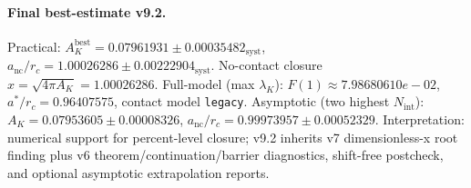 \paragraph{Final best-estimate v9.2.}
Practical: $A_K^{\mathrm{best}} = 0.07961931 \pm 0.00035482_{\mathrm{syst}}$, $a_{\mathrm{nc}}/r_c = 1.00026286 \pm 0.00222904_{\mathrm{syst}}$.
No-contact closure $x = \sqrt{4\pi A_K} = 1.00026286$.
Full-model (max $\lambda_K$): $F(1) \approx 7.98680610e-02$, $a^*/r_c = 0.96407575$, contact model \texttt{legacy}.
Asymptotic (two highest $N_{\mathrm{int}}$): $A_K = 0.07953605 \pm 0.00008326$, $a_{\mathrm{nc}}/r_c = 0.99973957 \pm 0.00052329$.
Interpretation: numerical support for percent-level closure; v9.2 inherits v7 dimensionless-x root finding plus v6 theorem/continuation/barrier diagnostics, shift-free postcheck, and optional asymptotic extrapolation reports.
